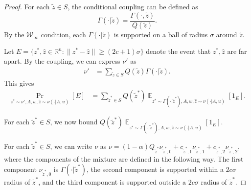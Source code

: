 \documentclass{article}
\newcommand{\norm}[1]{\|#1\|}
\newcommand{\R}{\mathbb{R}}
\DeclareMathOperator*{\E}{\mathbb{E}}
\newcommand{\cW}{\mathcal W}
\begin{document}
\begin{proof}
    For each $\tilde{z} \in S$, the conditional coupling can be defined as
    \[
    \Gamma( \cdot | \tilde{z}) = \frac{\Gamma( \cdot, \tilde{z})}{Q(\tilde{z})}.
    \]
    By the $\cW_\infty$ condition, each $\Gamma( \cdot | \tilde{z})$ is supported on a ball of radius $\sigma$ around $\tilde{z}$.

    Let $ E = \{ z^*, \widehat{z} \in \R^n: \norm{ z^* - \widehat{z}} \geq \left( 2c+1 \right)\sigma\}$ denote the event that $z^*, \widehat{z}$ are far apart.
  By the coupling, we can express $\nu'$ as 
  \begin{align*}
    \nu' &= \sum_{\tilde{z} \in S} Q(\tilde{z}) \Gamma( \cdot | \tilde{z}).
  \end{align*}
  This gives 
  \begin{align*} 
    \Pr_{z^* \sim \nu', A , w, \widehat{z} \sim \nu(\cdot | A, u)} \left[ E \right] & = \sum_{\tilde{z}^* \in S} Q ( \tilde{z}^*) \E_{z^*\sim \Gamma( \cdot | \tilde{z}^*) , A , w, \widehat{z} \sim \nu(\cdot | A, u) } \left[ {1}_E \right].
  \end{align*}
  
    For each $\tilde{z}^* \in S$, we now bound $Q ( \tilde{z}^*) \E_{z^*\sim \Gamma( \cdot | \tilde{z}^*) , A , w, \widehat{z} \sim \nu(\cdot | A, u) } \left[ {1}_E \right].$ 

		For each $\tilde{z}^* \in S$, we can write $\nu$ as $\nu = \left( 1- \alpha \right) Q_{\tilde{z}^*} \nu_{\tilde{z}^*, 0} + c_{\tilde{z}^*, 1 } \nu_{\tilde{z}^*, 1} + c_{\tilde{z}^*,2} \nu_{\tilde{z}^*,2}$, where the components of the mixture are defined in the following way. The first component $\nu_{\tilde{z}^*,0}$ is $\Gamma( \cdot | \tilde{z}^*)$, the second component is supported within a $2 c \sigma$ radius of $\tilde{z}^*$, and the third component is supported outside a $2 c \sigma $ radius of $\tilde{z}^*$.


\end{proof}
\end{document}
